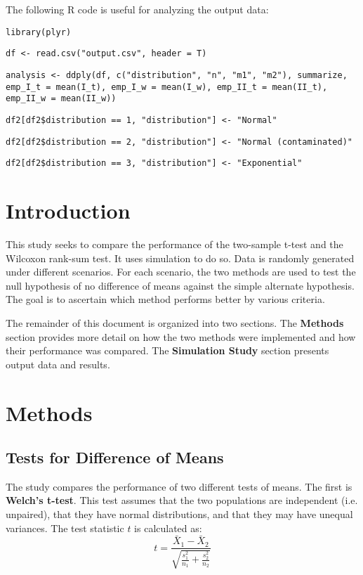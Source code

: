 \documentclass{report}
\begin{document}
The following R code is useful for analyzing the output data:
\begin{flushleft}
	\texttt{library(plyr)}

	\texttt{df <- read.csv("output.csv", header = T)}
	
	\texttt{analysis <- ddply(df, 
	     c("distribution", "n", "m1", "m2"), 
	     summarize, 
	     emp\_I\_t = mean(I\_t),
	     emp\_I\_w = mean(I\_w),
	     emp\_II\_t = mean(II\_t),
	     emp\_II\_w = mean(II\_w))}
	
	\texttt{df2[df2\$distribution == 1, "distribution"] <- "Normal"}

	\texttt{df2[df2\$distribution == 2, "distribution"] <- "Normal
	(contaminated)"}

	\texttt{df2[df2\$distribution == 3, "distribution"] <- "Exponential"}
\end{flushleft}

\newpage

\section*{Introduction}
This study seeks to compare the performance of the two-sample t-test and the
Wilcoxon rank-sum test. It uses simulation to do so. Data is randomly generated
under different scenarios. For each scenario, the two methods are used to test the 
null hypothesis of no difference of means against the simple alternate hypothesis. 
The goal is to ascertain which method performs better by various criteria.

The remainder of this document is organized into two sections. The
\textbf{Methods} section provides more detail on how the two methods were
implemented and how their performance was compared. The \textbf{Simulation
Study} section presents output data and results.

\section*{Methods}

\subsection*{Tests for Difference of Means}
The study compares the performance of two different tests of means. The first
is \textbf{Welch's t-test}. This test assumes that the two populations
are independent (i.e. unpaired), that they have normal distributions, and that
they may have unequal variances. The test statistic $t$ is calculated as:
\begin{equation}
	t = \frac{\bar{X}_1 - \bar{X}_2}{\sqrt{\frac{s^2_1}{n_1} + \frac{s^2_2}{n_2}}}
\end{equation}
\end{document}
